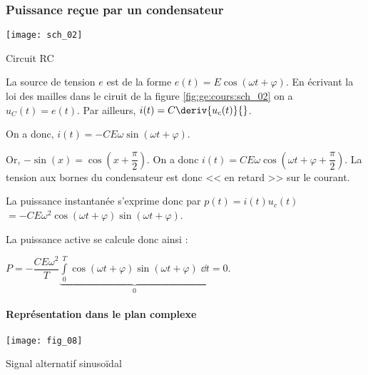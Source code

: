 \subsubsection{Puissance reçue par un condensateur}
\begin{marginfigure}
\centering
\texttt{[image: sch\_02]}
\caption{Circuit RC \label{fig:ge:cours:sch_02}}
\end{marginfigure}

La source de tension $e$ est de la forme $e(t)=E\cos\left(\omega t + \varphi\right)$. En écrivant la loi des mailles dans le ciruit de la figure \ref{fig:ge:cours:sch_02} on a $u_C(t)=e(t)$. Par ailleurs,  $i(t)=C\deriv{u_c(t)}{}$.

On a donc, $i(t)=-CE\omega\sin\left(\omega t + \varphi\right)$.

Or, $-\sin(x) =\cos(x+\dfrac{\pi}{2})$. On a donc 
$i(t)=CE\omega\cos\left(\omega t + \varphi+\dfrac{\pi}{2}\right)$. La tension aux bornes du condensateur est donc << en retard >> sur le courant. 


La puissance instantanée s'exprime donc par $p(t)=i(t) u_c(t)$
$= -CE\omega^2\cos\left(\omega t + \varphi\right)\sin\left(\omega t + \varphi\right)$.

La puissance active se calcule donc ainsi :

$P= -\dfrac{CE\omega^2}{T}\underbrace{\int\limits_{0}^{T} \cos\left(\omega t + \varphi\right)\sin\left(\omega t + \varphi\right)\; \dd t}_{0}=0$.


\paragraph{Représentation dans le plan complexe}

\begin{marginfigure}
\texttt{[image: fig\_08]}
\caption{Signal alternatif sinusoïdal \label{fig:ge:cours:fig_08}}
\end{marginfigure}


%
%



